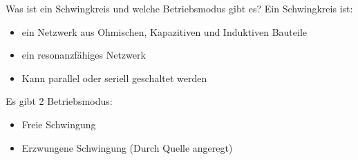 \setcounter{CardID}{4}

\begin{karte}{Was ist ein Schwingkreis und welche Betriebsmodus gibt es?}
	Ein Schwingkreis ist:\\
	\begin{itemize}
		\item ein Netzwerk aus Ohmischen, Kapazitiven und Induktiven Bauteile
		\item ein resonanzfähiges Netzwerk
		\item Kann parallel oder seriell geschaltet werden
	\end{itemize}
	Es gibt 2 Betriebsmodus:
	\begin{itemize}
		\item Freie Schwingung 
		\item Erzwungene Schwingung (Durch Quelle angeregt)
	\end{itemize}
\end{karte}